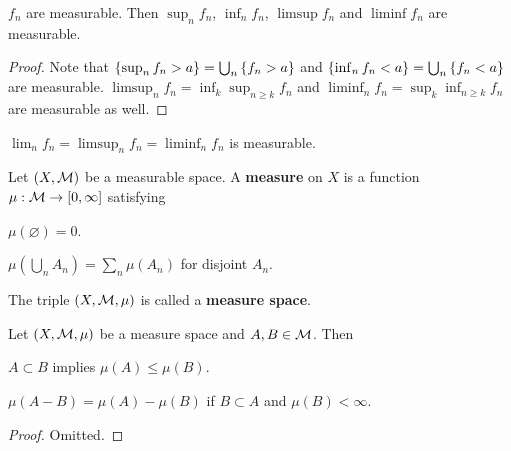 \begin{proposition}
    $f_n$ are measurable. Then $\sup_n f_n$, $\inf_n f_n$, $\limsup f_n$ 
    and $\liminf f_n$ are measurable.
\end{proposition}
\begin{proof}
    Note that $\left\{ {\sup_n f_n > a} \right\} = \bigcup_n \left\{ {f_n > a} \right\}$ and 
    $\left\{ {\inf_n f_n < a} \right\} = \bigcup_n \left\{ {f_n < a} \right\}$ are measurable. 
    $\limsup_n f_n = \inf_k\sup_{n\geq k} f_n$ and $\liminf_n f_n 
    = \sup_k\inf_{n\geq k} f_n$ are measurable as well.
\end{proof}
\begin{remark}
    $\lim_n f_n = \limsup_n f_n = \liminf_n f_n$ is measurable. 
\end{remark}

\begin{definition}
    Let $(X,\mathcal{M})$ be a measurable space. A \textbf{measure} on $X$ is a 
    function $\mu:\mathcal{M}\to[0,\infty]$ satisfying
    \begin{thmenum}
        \item $\mu(\varnothing) = 0$.
        \item $\mu(\bigcup_n A_n) = \sum_n \mu(A_n)$ for disjoint $A_n$.
    \end{thmenum}
    The triple $(X,\mathcal{M},\mu)$ is called a \textbf{measure space}.
\end{definition}

\begin{proposition}
    Let $(X,\mathcal{M},\mu)$ be a measure space and $A,B\in\mathcal{M}$. Then
    \begin{thmenum}
        \item $A\subset B$ implies $\mu(A)\leq \mu(B)$.
        \item $\mu(A-B) = \mu(A) - \mu(B)$ if $B\subset A$ and $\mu(B)<\infty$.
    \end{thmenum}
\end{proposition}
\begin{proof}
    Omitted.
\end{proof}

